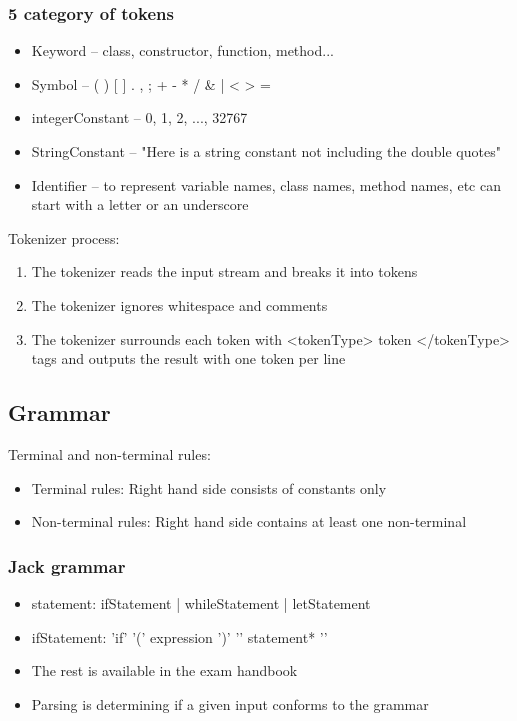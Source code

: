 \documentclass[12pt,a4paper]{article}
\begin{document}
\subsubsection{5 category of tokens}
\begin{itemize}
    \item Keyword -- class, constructor, function, method... 
    \item Symbol -- { } ( ) [ ] . , ; + - * / \& | < > = ~
    \item integerConstant -- 0, 1, 2, ..., 32767
    \item StringConstant -- "Here is a string constant not including the double quotes"
    \item Identifier -- to represent variable names, class names, method names, etc can start with a letter or an underscore
\end{itemize}
Tokenizer process:
\begin{enumerate}
    \item The tokenizer reads the input stream and breaks it into tokens
    \item The tokenizer ignores whitespace and comments
    \item The tokenizer surrounds each token with <tokenType> token </tokenType> tags and outputs the result with one token per line
\end{enumerate}

\subsection{Grammar}   
Terminal and non-terminal rules:
\begin{itemize}
    \item Terminal rules: Right hand side consists of constants only
    \item Non-terminal rules: Right hand side contains at least one non-terminal
\end{itemize}

\subsubsection{Jack grammar}
\begin{itemize}
    \item statement: ifStatement | whileStatement | letStatement 
    \item ifStatement: 'if' '(' expression ')' '{' statement* '}' 
    \item The rest is available in the exam handbook
    \item Parsing is determining if a given input conforms to the grammar
\end{itemize}
\end{document}
